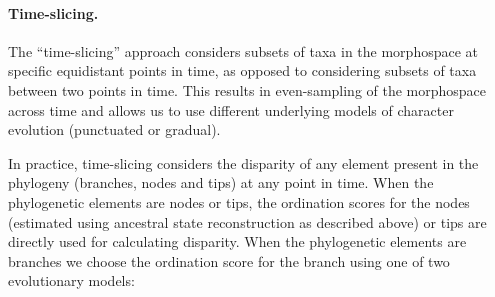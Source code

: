 \documentclass[12pt,a4paper]{article}
\begin{document}
\paragraph{Time-slicing.} 
\label{time_slicing}
The ``time-slicing'' approach considers subsets of taxa in the morphospace at specific equidistant points in time, as opposed to considering subsets of taxa between two points in time.
This results in even-sampling of the morphospace across time and allows us to use different underlying models of character evolution (punctuated or gradual). 

In practice, time-slicing considers the disparity of any element present in the phylogeny (branches, nodes and tips) at any point in time.
When the phylogenetic elements are nodes or tips, the ordination scores for the nodes (estimated using ancestral state reconstruction as described above) or tips are directly used for calculating disparity.
When the phylogenetic elements are branches we choose the ordination score for the branch using one of two evolutionary models:
\end{document}
